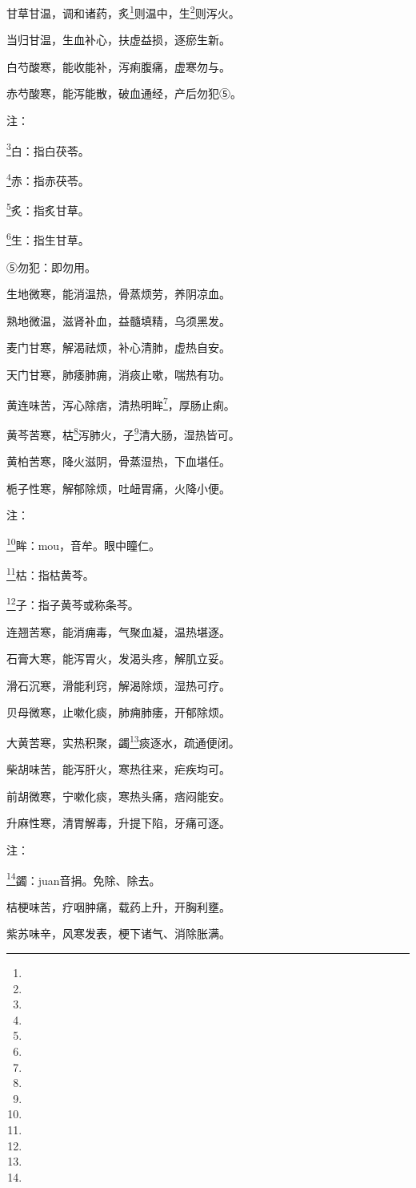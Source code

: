 \documentclass[a4paper,12pt,UTF8,twoside]{ctexbook}
\begin{document}
甘草甘温，调和诸药，炙\footnote{}则温中，生\footnote{}则泻火。

当归甘温，生血补心，扶虚益损，逐瘀生新。

白芍酸寒，能收能补，泻痢腹痛，虚寒勿与。

赤芍酸寒，能泻能散，破血通经，产后勿犯⑤。

注：

\footnote{}白：指白茯苓。

\footnote{}赤：指赤茯苓。

\footnote{}炙：指炙甘草。

\footnote{}生：指生甘草。

⑤勿犯：即勿用。

生地微寒，能消温热，骨蒸烦劳，养阴凉血。

熟地微温，滋肾补血，益髓填精，乌须黑发。

麦门甘寒，解渴祛烦，补心清肺，虚热自安。

天门甘寒，肺痿肺痈，消痰止嗽，喘热有功。

黄连味苦，泻心除痞，清热明眸\footnote{}，厚肠止痢。

黄芩苦寒，枯\footnote{}泻肺火，子\footnote{}清大肠，湿热皆可。

黄柏苦寒，降火滋阴，骨蒸湿热，下血堪任。

栀子性寒，解郁除烦，吐衄胃痛，火降小便。

注：

\footnote{}眸：mou，音牟。眼中瞳仁。

\footnote{}枯：指枯黄芩。

\footnote{}子：指子黄芩或称条芩。

连翘苦寒，能消痈毒，气聚血凝，温热堪逐。

石膏大寒，能泻胃火，发渴头疼，解肌立妥。

滑石沉寒，滑能利窍，解渴除烦，湿热可疗。

贝母微寒，止嗽化痰，肺痈肺痿，开郁除烦。

大黄苦寒，实热积聚，蠲\footnote{}痰逐水，疏通便闭。

柴胡味苦，能泻肝火，寒热往来，疟疾均可。

前胡微寒，宁嗽化痰，寒热头痛，痞闷能安。

升麻性寒，清胃解毒，升提下陷，牙痛可逐。

注：

\footnote{}蠲：juan音捐。免除、除去。

桔梗味苦，疗咽肿痛，载药上升，开胸利壅。

紫苏味辛，风寒发表，梗下诸气、消除胀满。
\end{document}

